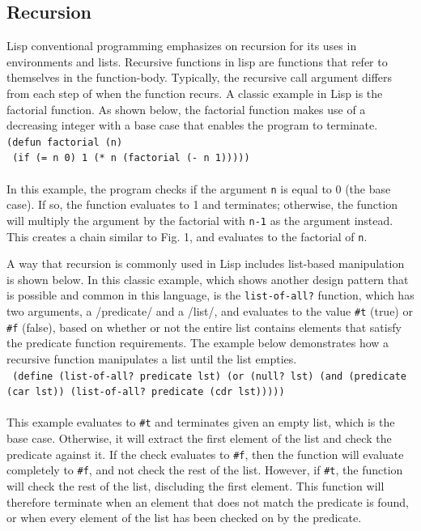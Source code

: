 \documentclass[journal]{IEEEtran}
\begin{document}
\subsection{Recursion}
Lisp conventional programming emphasizes on recursion for its uses in environments and lists. Recursive functions in lisp are functions that refer to themselves in the function-body. Typically, the recursive call argument differs from each step of when the function recurs. A classic example in Lisp is the factorial function. As shown below, the factorial function makes use of a decreasing integer with a base case that enables the program to terminate. \\



\texttt{(defun factorial (n)}\\\texttt{
	(if (= n 0)
	1
	(* n (factorial (- n 1)))))
}\\\\In this example, the program checks if the argument \texttt{n} is equal to 0 (the base case). If so, the function evaluates to 1 and terminates; otherwise, the function will multiply the argument by the factorial with \texttt{n-1} as the argument instead. This creates a chain similar to Fig. 1, and evaluates to the factorial of \texttt{n}.




A way that recursion is commonly used in Lisp includes list-based manipulation is shown below. In this classic example, which shows another design pattern that is possible and common in this language, is the \texttt{list-of-all?} function, which has two arguments, a /predicate/ and a /list/, and evaluates to the value \texttt{\#t} (true) or \texttt{\#f} (false), based on whether or not the entire list contains elements that satisfy the predicate function requirements. The example below demonstrates how a recursive function manipulates a list until the list empties.\\

\texttt{
	(define (list-of-all? predicate lst)
			(or 
				(null? lst)
				(and (predicate (car lst))
					 (list-of-all? predicate (cdr lst)))))
}\\\\This example evaluates to \texttt{\#t} and terminates given an empty list, which is the base case. Otherwise, it will extract the first element of the list and check the predicate against it. If the check evaluates to \texttt{\#f}, then the function will evaluate completely to \texttt{\#f}, and not check the rest of the list. However, if \texttt{\#t}, the function will check the rest of the list, discluding the first element. This function will therefore terminate when an element that does not match the predicate is found, or when every element of the list has been checked on by the predicate.
\end{document}
